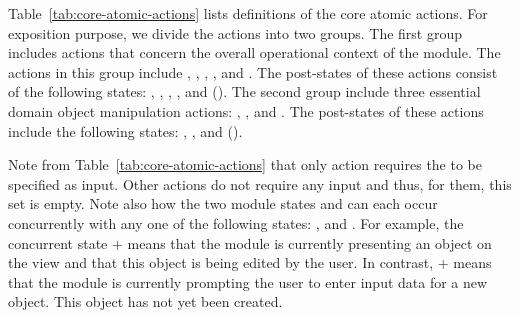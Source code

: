 %
Table~\ref{tab:core-atomic-actions} lists definitions of the core atomic actions. %
For exposition purpose, we divide the actions into two groups. %
The first group includes actions that concern the overall operational context of the module.
The actions in this group include , , , , and . The post-states of these actions consist of the following states: , , , , and  (\resp). 
%
The second group include three essential domain object manipulation actions: , , and . The post-states of these actions include the following states: , , and  (\resp).
%

Note from Table~\ref{tab:core-atomic-actions} that only action  requires the  to be specified as input. Other actions do not require any input and thus, for them, this set is empty. Note also how the two module states  and  can each occur concurrently with any one of the following states: ,  and . For example, the concurrent state  +  means that the module is currently presenting an object on the view and that this object is being edited by the user. In contrast,  +  means that the module is currently prompting the user to enter input data for a new object. This object has not yet been created.
